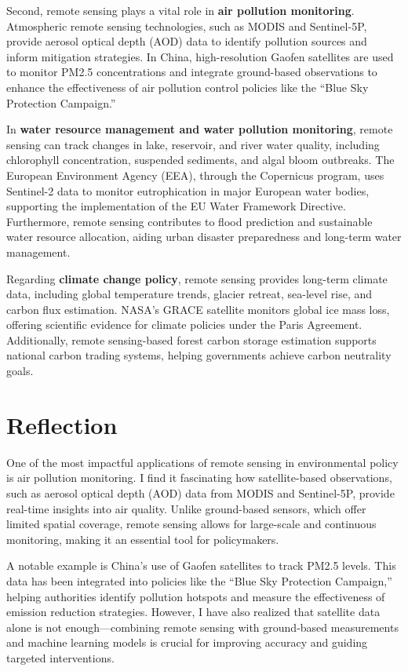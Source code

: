 \documentclass[
  letterpaper,
]{scrbook}
\begin{document}
Second, remote sensing plays a vital role in \textbf{air pollution
monitoring}. Atmospheric remote sensing technologies, such as MODIS and
Sentinel-5P, provide aerosol optical depth (AOD) data to identify
pollution sources and inform mitigation strategies. In China,
high-resolution Gaofen satellites are used to monitor PM2.5
concentrations and integrate ground-based observations to enhance the
effectiveness of air pollution control policies like the ``Blue Sky
Protection Campaign.''

In \textbf{water resource management and water pollution monitoring},
remote sensing can track changes in lake, reservoir, and river water
quality, including chlorophyll concentration, suspended sediments, and
algal bloom outbreaks. The European Environment Agency (EEA), through
the Copernicus program, uses Sentinel-2 data to monitor eutrophication
in major European water bodies, supporting the implementation of the EU
Water Framework Directive. Furthermore, remote sensing contributes to
flood prediction and sustainable water resource allocation, aiding urban
disaster preparedness and long-term water management.

Regarding \textbf{climate change policy}, remote sensing provides
long-term climate data, including global temperature trends, glacier
retreat, sea-level rise, and carbon flux estimation. NASA's GRACE
satellite monitors global ice mass loss, offering scientific evidence
for climate policies under the Paris Agreement. Additionally, remote
sensing-based forest carbon storage estimation supports national carbon
trading systems, helping governments achieve carbon neutrality goals.

\section{Reflection}\label{reflection-2}

One of the most impactful applications of remote sensing in
environmental policy is air pollution monitoring. I find it fascinating
how satellite-based observations, such as aerosol optical depth (AOD)
data from MODIS and Sentinel-5P, provide real-time insights into air
quality. Unlike ground-based sensors, which offer limited spatial
coverage, remote sensing allows for large-scale and continuous
monitoring, making it an essential tool for policymakers.

A notable example is China's use of Gaofen satellites to track PM2.5
levels. This data has been integrated into policies like the ``Blue Sky
Protection Campaign,'' helping authorities identify pollution hotspots
and measure the effectiveness of emission reduction strategies. However,
I have also realized that satellite data alone is not enough---combining
remote sensing with ground-based measurements and machine learning
models is crucial for improving accuracy and guiding targeted
interventions.
\end{document}

